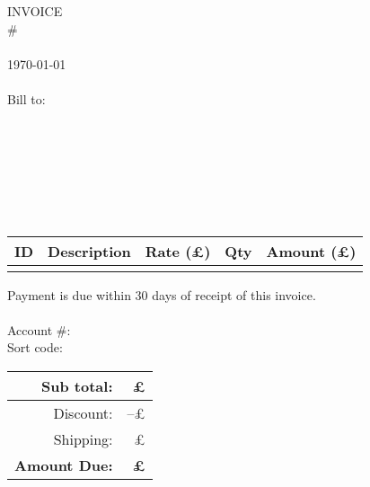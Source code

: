 \documentclass[a4paper,12pt]{article}
\newcommand{\customerAddress}{}
\newcommand{\invoiceNumber}{}
\begin{document}
\noindent \parbox[t]{0.5\textwidth}{ {\Huge INVOICE}\\ \#\invoiceNumber\\ ~\\ \today\\ ~\\ {\color{gray}Bill to:}\\\noindent \customerAddress}
\hfill
\parbox[t]{0.35\textwidth}{\raggedleft {\large\myName}\\ \myAddress\\~\\ \myPhoneNumber\\ \myEmail}\\
\begin{center}
	\begin{tabular}{| >{\small\raggedright}p{} | >{\raggedright}p{} | r | c | r |}
		\hline
		\normalsize ID & Description & Rate (\pounds) & Qty & Amount (\pounds)\\
		\hline
		\invoiceInfo
		\hline
	\end{tabular}
\end{center}
\vfill
\begin{multicols}{2}
	 \noindent Payment is due within 30 days of receipt of this invoice.\\

	 \\ Account \#: \accountNumber \\ Sort code: \sortCode\\
	
	\columnbreak
	\begin{flushright}
		\begin{tabular}{ r r }
			Sub total: & \pounds\subtotal\\
			\hline
			Discount: & --\pounds\discount\\
			Shipping: & \pounds\shipping\\
			\hline \hline
			\bf Amount Due: & \bf\pounds\grandtotal
		\end{tabular}
	\end{flushright}
\end{multicols}
\end{document}

